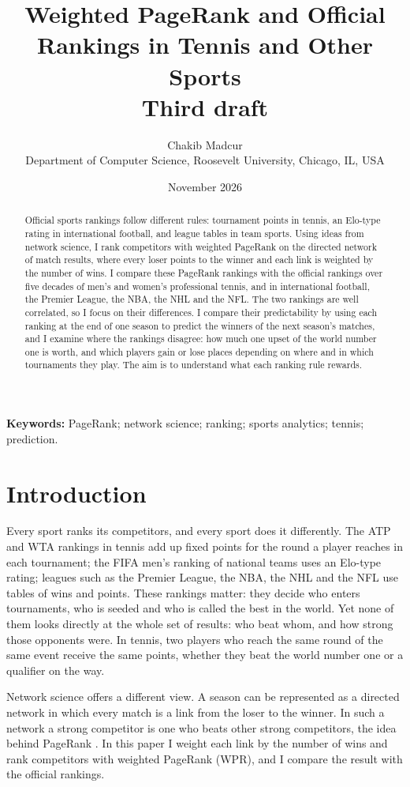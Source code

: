 \documentclass[11pt]{article}
\title{Weighted PageRank and Official Rankings in Tennis and Other Sports\\[0.4em]
\large Third draft}
\author{Chakib Madcur\\
\small Department of Computer Science, Roosevelt University, Chicago, IL, USA}
\date{November 2026}
\begin{document}
\maketitle

\begin{abstract}
Official sports rankings follow different rules: tournament points in tennis, an Elo-type rating in international football, and league tables in team sports. Using ideas from network science, I rank competitors with weighted PageRank on the directed network of match results, where every loser points to the winner and each link is weighted by the number of wins. I compare these PageRank rankings with the official rankings over five decades of men's and women's professional tennis, and in international football, the Premier League, the NBA, the NHL and the NFL. The two rankings are well correlated, so I focus on their differences. I compare their predictability by using each ranking at the end of one season to predict the winners of the next season's matches, and I examine where the rankings disagree: how much one upset of the world number one is worth, and which players gain or lose places depending on where and in which tournaments they play. The aim is to understand what each ranking rule rewards.
\end{abstract}

\noindent\textbf{Keywords:} PageRank; network science; ranking; sports analytics; tennis; prediction.

\section{Introduction}

Every sport ranks its competitors, and every sport does it differently. The ATP and WTA rankings in tennis add up fixed points for the round a player reaches in each tournament; the FIFA men's ranking of national teams uses an Elo-type rating; leagues such as the Premier League, the NBA, the NHL and the NFL use tables of wins and points. These rankings matter: they decide who enters tournaments, who is seeded and who is called the best in the world. Yet none of them looks directly at the whole set of results: who beat whom, and how strong those opponents were. In tennis, two players who reach the same round of the same event receive the same points, whether they beat the world number one or a qualifier on the way.

Network science offers a different view. A season can be represented as a directed network in which every match is a link from the loser to the winner. In such a network a strong competitor is one who beats other strong competitors, the idea behind PageRank \citep{brin1998}. In this paper I weight each link by the number of wins and rank competitors with weighted PageRank (WPR), and I compare the result with the official rankings.
\end{document}
